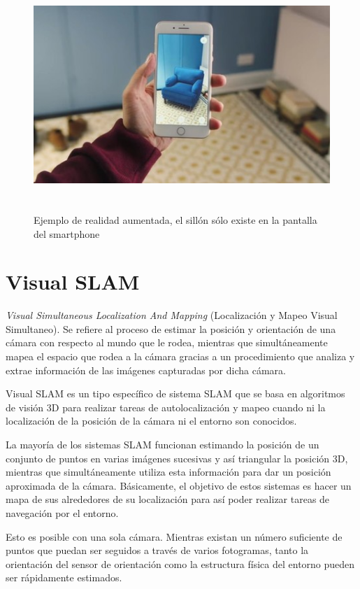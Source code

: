 \begin{figure}[htbp]
\begin{center}
\label{fig:realiadAumentada}\includegraphics[height=8.0cm]{img/cap2/realidadAumentada.jpg}
\end{center}
\caption{Ejemplo de realidad aumentada, el sillón sólo existe en la pantalla del smartphone}
\end{figure}


\section{Visual SLAM}

\textit{Visual Simultaneous Localization And Mapping} (Localización y Mapeo Visual Simultaneo). Se refiere al proceso de estimar la posición y orientación de una cámara con respecto al mundo que le rodea, mientras que simultáneamente mapea el espacio que rodea a la cámara gracias a un procedimiento que analiza y extrae información de las imágenes capturadas por dicha cámara.

Visual SLAM es un tipo específico de sistema SLAM que se basa en algoritmos de visión 3D
para realizar tareas de autolocalización y mapeo cuando ni la localización de la posición de la cámara ni el entorno son conocidos.

La mayoría de los sistemas SLAM funcionan estimando la posición de un conjunto de puntos en varias imágenes sucesivas y así triangular la posición 3D, mientras que simultáneamente utiliza esta información para dar un posición aproximada de la cámara. Básicamente, el objetivo de estos sistemas es hacer un mapa de sus alrededores de su localización para así poder realizar tareas de navegación por el entorno.

Esto es posible con una sola cámara. Mientras existan un número suficiente de puntos que puedan ser seguidos a través de varios fotogramas, tanto la orientación del sensor de orientación como la estructura física del entorno pueden ser rápidamente estimados.

